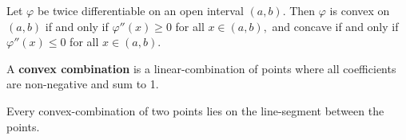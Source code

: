 \documentclass{article}
\begin{document}
\begin{theorem}\label{second-derivative-test-for-convexity}
Let $\varphi$ be twice \@{differentiable} on an \@{open} \@{interval} $(a,b).$ Then
$\varphi$ is \@{convex} on $(a,b)$ if and only if $\varphi''(x) \geq 0$ for all
$x \in (a,b),$ and \@{concave} if and only if $\varphi''(x) \leq 0$ for all
$x \in (a,b).$
\end{theorem}

\begin{definition}
A \textbf{convex combination} is a \@{linear-combination} of \@{points} where all \@{coefficients} are non-negative and sum to 1.
\end{definition}

\begin{note}
Every \@{convex-combination} of two \@{points} lies on the \@{line-segment} between the \@{points}.
\end{note}
\end{document}
